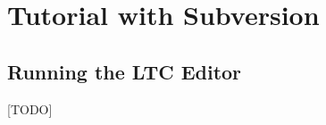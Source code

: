 \section{Tutorial with Subversion} \label{sec:tutorial-svn}

\subsection{Running the LTC Editor}

[TODO]
